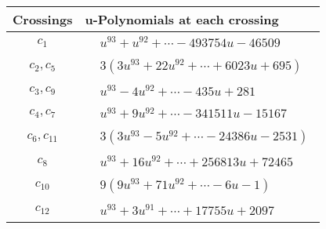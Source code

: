 \documentclass[1p]{elsarticle_modified}
\theoremstyle{definition}
\begin{document}
\begin{tabular}{m{50pt}|m{274pt}}
Crossings & \hspace{64pt}u-Polynomials at each crossing \\
\hline $$\begin{aligned}c_{1}\end{aligned}$$&$\begin{aligned}
&u^{93}+u^{92}+\cdots-493754 u-46509
\end{aligned}$\\
\hline $$\begin{aligned}c_{2},c_{5}\end{aligned}$$&$\begin{aligned}
&3(3 u^{93}+22 u^{92}+\cdots+6023 u+695)
\end{aligned}$\\
\hline $$\begin{aligned}c_{3},c_{9}\end{aligned}$$&$\begin{aligned}
&u^{93}-4 u^{92}+\cdots-435 u+281
\end{aligned}$\\
\hline $$\begin{aligned}c_{4},c_{7}\end{aligned}$$&$\begin{aligned}
&u^{93}+9 u^{92}+\cdots-341511 u-15167
\end{aligned}$\\
\hline $$\begin{aligned}c_{6},c_{11}\end{aligned}$$&$\begin{aligned}
&3(3 u^{93}-5 u^{92}+\cdots-24386 u-2531)
\end{aligned}$\\
\hline $$\begin{aligned}c_{8}\end{aligned}$$&$\begin{aligned}
&u^{93}+16 u^{92}+\cdots+256813 u+72465
\end{aligned}$\\
\hline $$\begin{aligned}c_{10}\end{aligned}$$&$\begin{aligned}
&9(9 u^{93}+71 u^{92}+\cdots-6 u-1)
\end{aligned}$\\
\hline $$\begin{aligned}c_{12}\end{aligned}$$&$\begin{aligned}
&u^{93}+3 u^{91}+\cdots+17755 u+2097
\end{aligned}$\\
\hline
\end{tabular}\\~\\
\end{document}
